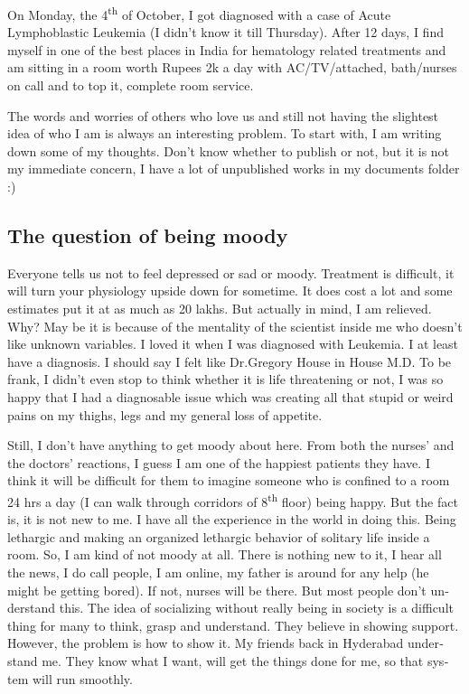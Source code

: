 \newpage
\begin{english}
\vskip 2pt
On Monday, the 4\textsuperscript{th} of October, I got diagnosed with a case of Acute Lymphoblastic Leukemia 
(I didn't know it till Thursday). After 12 days, I find myself in one of the best places in
 India for hematology related treatments and am sitting in a room worth Rupees 2k a day
 with AC/TV/attached, bath/nurses on call and to top it, complete room service.

The words and worries of others who love us and still not having the slightest idea of
who I am is always an interesting problem. To start with, I am writing down some of
my thoughts. Don't know whether to publish or not, but it is not my immediate concern,
I have a lot of unpublished works in my documents folder :)

\subsection*{The question of being moody} 

Everyone tells us not to feel depressed or sad or moody. Treatment is difficult, it 
will turn your physiology upside down for sometime. It does cost a lot and some 
estimates put it at as much as 20 lakhs. But actually in mind, I am relieved. Why? May 
be it is because of the mentality of the scientist inside me who doesn't like unknown variables. I loved
it when I was diagnosed with Leukemia. I at least have a diagnosis. I should say I 
felt like Dr.Gregory House in House M.D. To be frank, I didn't even stop to think whether
it is life threatening or not, I was so happy that I had a diagnosable issue which was 
creating all that stupid or weird pains on my thighs, legs and my general loss of appetite.

Still, I don't have anything to get moody about here. From both the nurses' and the doctors' reactions, I guess
I am one of the happiest patients they have. I think it will be difficult for them to 
imagine someone who is confined to a room 24 hrs a day (I can walk through corridors of
8\textsuperscript{th} floor) being happy. But the fact is, it is not new to me. I have all the experience in 
the world in doing this. Being lethargic and making an organized lethargic behavior of
solitary life inside a room. So, I am kind of not moody at all. There is nothing new to it,
I hear all the news, I do call people, I am online, my father is around for any help (he might
be getting bored). If not, nurses will be there. But most people don't understand this. The
idea of socializing without really being in society is a difficult thing for many to think, 
grasp and understand. They believe in showing support. However, the problem is how to show it. My 
friends back in Hyderabad understand me. They know what I want, will get the things done for
me, so that system will run smoothly. 


\end{english}

